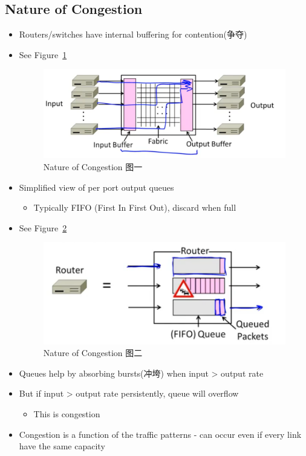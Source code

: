 \documentclass[12pt]{ctexart}   %
\begin{document}
	\subsection{Nature of Congestion}
	\begin{itemize}
		\item Routers/switches have internal buffering for contention(争夺)
		\item See Figure~\ref{fig:7-1-1}
		  
		 \begin{figure}[h!] %
		\centering
		 \includegraphics[scale=0.7]{images/7-1-1}
		\caption{ Nature of Congestion 图一}
		 \label{fig:7-1-1}
		 \end{figure}
		 
		 \item Simplified view of per port output queues
		 \begin{itemize}
		 	\item Typically FIFO (First In First Out), discard when full
		 \end{itemize}
		 \item See Figure~\ref{fig:7-1-2}
		  
		 \begin{figure}[h!] %
		\centering
		 \includegraphics[scale=0.7]{images/7-1-2}
		\caption{ Nature of Congestion 图二}
		 \label{fig:7-1-2}
		 \end{figure}
		 
		 \item Queues help by absorbing bursts(冲垮) when input > output rate
		 \item But if input > output rate persistently, queue will overflow
		 \begin{itemize}
		 	\item This is congestion
		 \end{itemize}
		 
		 \item Congestion is a function of the traffic patterns - can occur even if every link have the same capacity
	\end{itemize}
	
\end{document}
